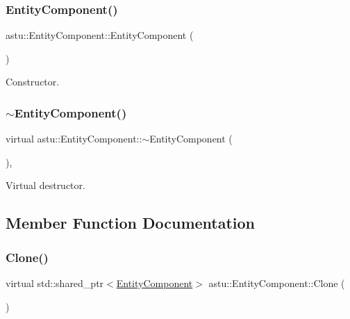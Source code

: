 \subsubsection{\texorpdfstring{Entity\+Component()}{EntityComponent()}}
{\footnotesize\ttfamily astu\+::\+Entity\+Component\+::\+Entity\+Component (\begin{DoxyParamCaption}{ }\end{DoxyParamCaption})\hspace{0.3cm}{\ttfamily [default]}}

Constructor. \mbox{\label{classastu_1_1EntityComponent_a17295f763e201247c22bc677541646e5}} 
\subsubsection{\texorpdfstring{$\sim$\+Entity\+Component()}{~EntityComponent()}}
{\footnotesize\ttfamily virtual astu\+::\+Entity\+Component\+::$\sim$\+Entity\+Component (\begin{DoxyParamCaption}{ }\end{DoxyParamCaption})\hspace{0.3cm}{\ttfamily [inline]}, {\ttfamily [virtual]}}

Virtual destructor. 

\subsection{Member Function Documentation}
\mbox{\label{classastu_1_1EntityComponent_afeddb5a899d831255a9a4f07269f3b2d}} 
\subsubsection{\texorpdfstring{Clone()}{Clone()}}
{\footnotesize\ttfamily virtual std\+::shared\+\_\+ptr$<$\hyperlink{classastu_1_1EntityComponent}{Entity\+Component}$>$ astu\+::\+Entity\+Component\+::\+Clone (\begin{DoxyParamCaption}{ }\end{DoxyParamCaption})\hspace{0.3cm}{\ttfamily [pure virtual]}}

